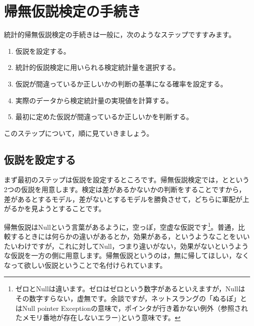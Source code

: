 \documentclass{ltjsbook}
\begin{document}



\section{帰無仮説検定の手続き}
統計的帰無仮説検定の手続きは一般に，次のようなステップですすみます。
\begin{enumerate}
    \item 仮説を設定する。
    \item 統計的仮説検定に用いられる検定統計量を選択する。
    \item 仮説が間違っているか正しいかの判断の基準になる確率を設定する。
    \item 実際のデータから検定統計量の実現値を計算する。
    \item 最初に定めた仮説が間違っているか正しいかを判断する。
\end{enumerate}

このステップについて，順に見ていきましょう。
\subsection{仮説を設定する}
まず最初のステップは仮説を設定するところです。帰無仮説検定では，とという2つの仮説を用意します。検定は差があるかないかの判断をすることですから，差があるとするモデル，差がないとするモデルを勝負させて，どちらに軍配が上がるかを見ようとすることです。

帰無仮説はNullという言葉があるように，空っぽ，空虚な仮説です\footnote{ゼロとNullは違います。ゼロはゼロという数字があるといえますが，Nullはその数字すらない，虚無です。余談ですが，ネットスラングの「ぬるぽ」とはNull pointer Exceptionの意味で，ポインタが行き着かない例外（参照されたメモリ番地が存在しないエラー)という意味です。}。普通，比較するときには何らかの違いがあるとか，効果がある，というようなことをいいたいわけですが，これに対してNull，つまり違いがない，効果がないというような仮説を一方の側に用意します。帰無仮説というのは，無に帰してほしい，なくなって欲しい仮説ということで名付けられています。
\end{document}
